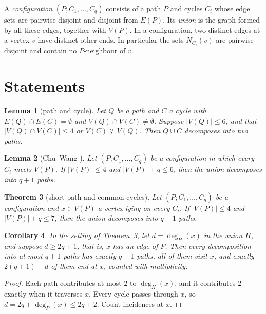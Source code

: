 \documentclass[11pt]{amsart}
\newtheorem{theorem}{Theorem}
\newtheorem{lemma}[theorem]{Lemma}
\newtheorem{corollary}[theorem]{Corollary}
\theoremstyle{definition}
\theoremstyle{remark}
\begin{document}
A \emph{configuration} $(P;C_1,\dots,C_q)$ consists of a path $P$ and cycles $C_i$ whose edge sets
are pairwise disjoint and disjoint from $E(P)$. Its \emph{union} is the graph formed by all these
edges, together with $V(P)$. In a configuration, two distinct edges at a vertex $v$ have distinct
other ends. In particular the sets $N_{C_i}(v)$ are pairwise disjoint and contain no
$P$-neighbour of $v$.

\section{Statements}

\begin{lemma}[path and cycle]\label{lem:pc}
Let $Q$ be a path and $C$ a cycle with $E(Q)\cap E(C)=\emptyset$ and $V(Q)\cap V(C)\ne\emptyset$.
Suppose $|V(Q)|\le 6$, and that $|V(Q)\cap V(C)|\le 4$ or $V(C)\not\subseteq V(Q)$. Then
$Q\cup C$ decomposes into two paths.
\end{lemma}

\begin{lemma}[Chu--Wang {\cite[Lemma 2.2]{CW}}]\label{lem:cw}
Let $(P;C_1,\dots,C_q)$ be a configuration in which every $C_i$ meets $V(P)$. If $|V(P)|\le 4$ and
$|V(P)|+q\le 6$, then the union decomposes into $q+1$ paths.
\end{lemma}

\begin{theorem}[short path and common cycles]\label{thm:main}
Let $(P;C_1,\dots,C_q)$ be a configuration and $x\in V(P)$ a vertex lying on every $C_i$. If
$|V(P)|\le 4$ and $|V(P)|+q\le 7$, then the union decomposes into $q+1$ paths.
\end{theorem}

\begin{corollary}\label{cor:ends}
In the setting of Theorem~\ref{thm:main}, let $d=\deg_{H}(x)$ in the union $H$, and suppose
$d\ge 2q+1$, that is, $x$ has an edge of $P$. Then every decomposition into at most $q+1$
paths has exactly $q+1$ paths, all of them visit $x$, and exactly $2(q+1)-d$ of them end at $x$,
counted with multiplicity.
\end{corollary}

\begin{proof}
Each path contributes at most $2$ to $\deg_H(x)$, and it contributes $2$ exactly when it
traverses $x$. Every cycle passes through $x$, so $d=2q+\deg_P(x)\le 2q+2$. Count incidences at
$x$.
\end{proof}
\end{document}
